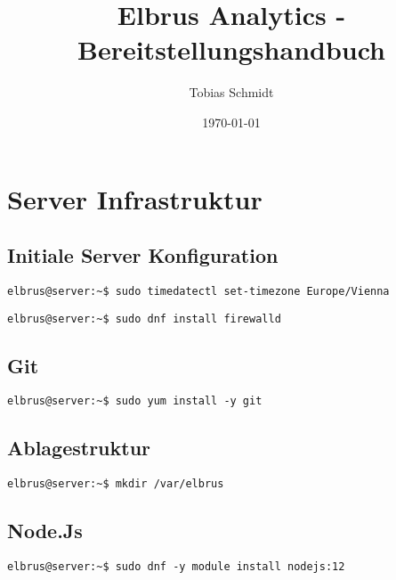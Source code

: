 \documentclass{article}
\begin{document}
	\title{Elbrus Analytics - Bereitstellungshandbuch}
	\author{Tobias Schmidt}
	\date{\today}
	\maketitle
	\newpage
	
	\section[Server Infrastruktur]{Server Infrastruktur}
	\subsection{Initiale Server Konfiguration}

	\begin{lstlisting}[caption={Setzen der Zeitzone auf 'Europa/Wien'.}]
		elbrus@server:~$ sudo timedatectl set-timezone Europe/Vienna
	\end{lstlisting}

	\begin{lstlisting}[caption={Installieren von dem 'firewalld' Service.}]
		elbrus@server:~$ sudo dnf install firewalld
	\end{lstlisting}

	\subsection{Git}
	\begin{lstlisting}[caption={Installieren von dem VCS 'git'.}]
		elbrus@server:~$ sudo yum install -y git
	\end{lstlisting}
	
	\subsection{Ablagestruktur}
	\lstset{style=commands}
	\begin{lstlisting}[caption={Anlegen der Verzeichnissstruktur.}]
		elbrus@server:~$ mkdir /var/elbrus
	\end{lstlisting}

	\subsection{Node.Js}
	\begin{lstlisting}[caption={Installieren des Framworks 'Node.Js'.}]
		elbrus@server:~$ sudo dnf -y module install nodejs:12
	\end{lstlisting}
\end{document}
